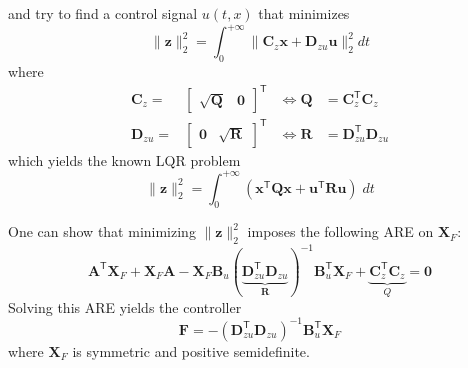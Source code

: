 and try to find a control signal $u(t,x)$ that minimizes
\begin{equation*}
    \|\mathbf{z}\|_2^2=\int_0^{+\infty}\|\mathbf{C}_z \mathbf{x}+\mathbf{D}_{zu}\mathbf{u}\|_2^2 dt
\end{equation*}
where
\begin{align*}
    \mathbf{C}_z=                               &
    \begin{bmatrix}
        \sqrt{\mathbf{Q}} & \mathbf{0}
    \end{bmatrix}^{\mathsf{T}} & \Leftrightarrow \mathbf{Q} & = \mathbf{C}_z^{\mathsf{T}}\mathbf{C}_z       \\
    \mathbf{D}_{zu}=                            &
    \begin{bmatrix}
        \mathbf{0} & \sqrt{\mathbf{R}}
    \end{bmatrix}^{\mathsf{T}} & \Leftrightarrow \mathbf{R} & = \mathbf{D}_{zu}^{\mathsf{T}}\mathbf{D}_{zu}
\end{align*}
which yields the known LQR problem
\begin{equation*}
    \|\mathbf{z}\|_2^2=\int_0^{+\infty}(\mathbf{x}^{\mathsf{T}}\mathbf{Q}\mathbf{x}+\mathbf{u}^{\mathsf{T}}\mathbf{R}\mathbf{u})\;dt
\end{equation*}

\newpar{}

One can show that minimizing $\|\mathbf{z}\|_2^2$ imposes the following ARE on $\mathbf{X}_F$:
\begin{equation*}
    \mathbf{A}^{\mathsf{T}}\mathbf{X}_F + \mathbf{X}_F \mathbf{A} - \mathbf{X}_F \mathbf{B}_u{(\underbrace{\mathbf{D}_{zu}^{\mathsf{T}}\mathbf{D}_{zu}}_{\mathbf{R}})}^{-1} \mathbf{B}_u^{\mathsf{T}} \mathbf{X}_F + \underbrace{\mathbf{C}_z^{\mathsf{T}}\mathbf{C}_z}_{Q} = \mathbf{0}
\end{equation*}
Solving this ARE yields the controller
\begin{equation*}
    \mathbf{F} = -{\left(\mathbf{D}_{zu}^{\mathsf{T}}\mathbf{D}_{zu}\right)}^{-1} \mathbf{B}_u^{\mathsf{T}}\mathbf{X}_F
\end{equation*}
where $\mathbf{X}_F$ is symmetric and positive semidefinite.

\newpar{}

